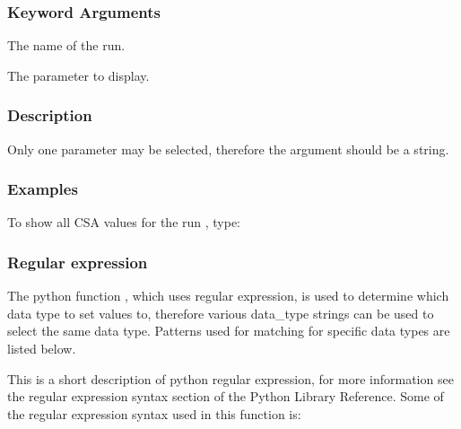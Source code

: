   
 \subsubsection{Keyword Arguments} 

   The name of the run.   

   The parameter to display.  

  

  
 \subsubsection{Description} 

 Only one parameter may be selected, therefore the  argument should be a string. 
  

  
 \subsubsection{Examples} 

 To show all CSA values for the run , type: 
  


  
 \subsubsection{Regular expression} 

 The python function , which uses regular expression, is used to determine which data type to set values to, therefore various data\_type strings can be used to select the same data type.  Patterns used for matching for specific data types are listed below. 
  

 This is a short description of python regular expression, for more information see the regular expression syntax section of the Python Library Reference.  Some of the regular expression syntax used in this function is: 
  

